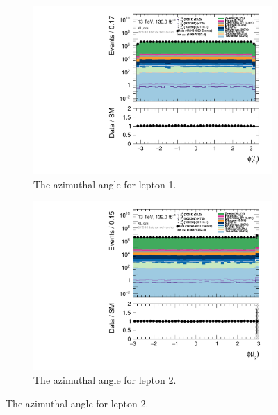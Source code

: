 \begin{figure}[H]
    \begin{subfigure}[t!]{0.49\textwidth}
        \includegraphics[width=\textwidth]{Figures/SlepSlep/CutAndCount/ML_cuts/hist1d_lepPhi[0]_ML_cuts.pdf}
    \caption{The azimuthal angle for lepton 1.}
    \label{fig:my_label}
    \end{subfigure}
    \begin{subfigure}[t!]{0.49\textwidth}
        \includegraphics[width=\textwidth]{Figures/SlepSlep/CutAndCount/ML_cuts/hist1d_lepPhi[1]_ML_cuts.pdf}
    \caption{The azimuthal angle for lepton 2.}
    \label{fig:my_label}
    \end{subfigure}
\end{figure}

